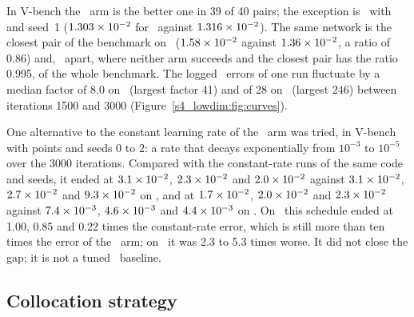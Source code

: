 In \textsf{V-bench} the \AdamLBFGS\ arm is the better one in 39 of 40 pairs; the exception
is \PH\ with  and seed~1 ($1.303\times 10^{-2}$ for \Adam\ against
$1.316\times 10^{-2}$). The same network is the closest pair of the benchmark on \PH\
($1.58\times 10^{-2}$ against $1.36\times 10^{-2}$, a ratio of 0.86) and, \PWone\ apart, where
neither arm succeeds and the closest pair has the ratio 0.995, of the whole benchmark.
The logged \Adam\ errors of one run fluctuate by a median factor of 8.0 on \PH\ (largest factor
41) and of 28 on \PLtwo\ (largest 246) between iterations 1500 and 3000
(Figure~\ref{s4_lowdim:fig:curves}).

One alternative to the constant learning rate of the \Adam\ arm was tried, in
\textsf{V-bench} with \strat{random} points and seeds 0 to 2: a rate that decays
exponentially from $10^{-3}$ to $10^{-5}$ over the 3000 iterations. Compared with the
constant-rate runs of the same code and seeds, it ended at $3.1\times 10^{-2}$, $2.3\times 10^{-2}$
and $2.0\times 10^{-2}$ against $3.1\times 10^{-2}$, $2.7\times 10^{-2}$ and $9.3\times 10^{-2}$ on \PH, and
at $1.7\times 10^{-2}$, $2.0\times 10^{-2}$ and $2.3\times 10^{-2}$ against $7.4\times 10^{-3}$,
$4.6\times 10^{-3}$ and $4.4\times 10^{-3}$ on \PLtwo. On \PH\ this schedule ended at 1.00,
0.85 and 0.22 times the constant-rate error, which is still more than ten times the
error of the \AdamLBFGS\ arm; on \PLtwo\ it was 2.3 to 5.3 times worse. It did not close
the gap; it is not a tuned \Adam\ baseline.

\subsection{Collocation strategy}\label{S3:sec:strategy}

